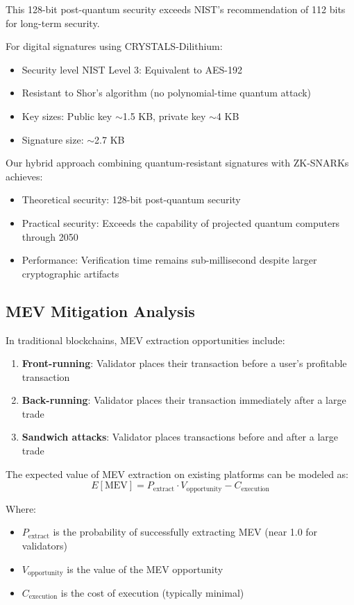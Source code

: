 \documentclass[12pt]{article}
\begin{document}
This 128-bit post-quantum security exceeds NIST's recommendation of 112 bits for long-term security.

For digital signatures using CRYSTALS-Dilithium:
\begin{itemize}
\item Security level NIST Level 3: Equivalent to AES-192
\item Resistant to Shor's algorithm (no polynomial-time quantum attack)
\item Key sizes: Public key $\sim$1.5 KB, private key $\sim$4 KB
\item Signature size: $\sim$2.7 KB
\end{itemize}

Our hybrid approach combining quantum-resistant signatures with ZK-SNARKs achieves:
\begin{itemize}
\item Theoretical security: 128-bit post-quantum security
\item Practical security: Exceeds the capability of projected quantum computers through 2050
\item Performance: Verification time remains sub-millisecond despite larger cryptographic artifacts
\end{itemize}

\subsection{MEV Mitigation Analysis}

In traditional blockchains, MEV extraction opportunities include:

\begin{enumerate}
\item \textbf{Front-running}: Validator places their transaction before a user's profitable transaction
\item \textbf{Back-running}: Validator places their transaction immediately after a large trade
\item \textbf{Sandwich attacks}: Validator places transactions before and after a large trade
\end{enumerate}

The expected value of MEV extraction on existing platforms can be modeled as:
\begin{equation}
E[\text{MEV}] = P_{\text{extract}} \cdot V_{\text{opportunity}} - C_{\text{execution}}
\end{equation}

Where:
\begin{itemize}
\item $P_{\text{extract}}$ is the probability of successfully extracting MEV (near 1.0 for validators)
\item $V_{\text{opportunity}}$ is the value of the MEV opportunity
\item $C_{\text{execution}}$ is the cost of execution (typically minimal)
\end{itemize}
\end{document}
